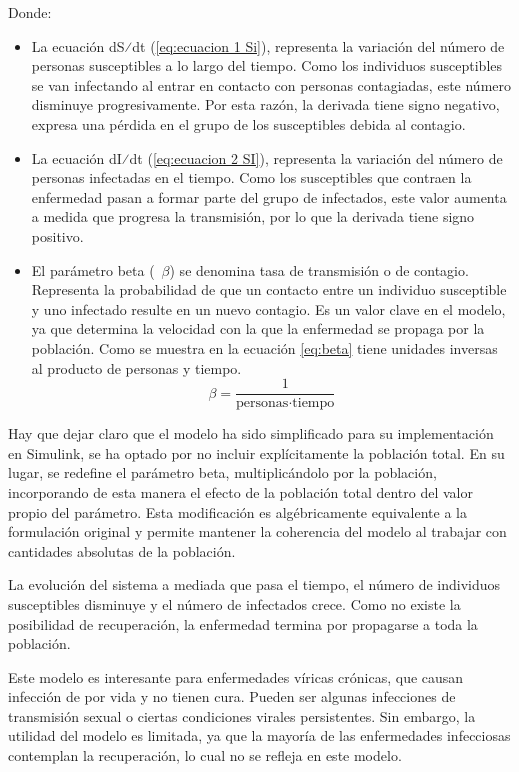 Donde:
\begin{itemize}
    \item 	La ecuación dS⁄dt (\ref{eq:ecuacion 1 Si}), representa la variación del número de personas susceptibles a lo largo del tiempo. Como los individuos susceptibles se van infectando al entrar en contacto con personas contagiadas, este número disminuye progresivamente. Por esta razón, la derivada tiene signo negativo, expresa una pérdida en el grupo de los susceptibles debida al contagio.
    \item 	La ecuación dI⁄dt (\ref{eq:ecuacion 2 SI}), representa la variación del número de personas infectadas en el tiempo. Como los susceptibles que contraen la enfermedad pasan a formar parte del grupo de infectados, este valor aumenta a medida que progresa la transmisión, por lo que la derivada tiene signo positivo.
    \item El parámetro beta (~$\beta$) se denomina tasa de transmisión o de contagio. Representa la probabilidad de que un contacto entre un individuo susceptible y uno infectado resulte en un nuevo contagio. Es un valor clave en el modelo, ya que determina la velocidad con la que la enfermedad se propaga por la población. Como se muestra en la ecuación \ref{eq:beta} tiene unidades inversas al producto de personas y tiempo.
    \begin{equation}
    \beta = \frac{1}{\text{personas} \cdot \text{tiempo}}
    \label{eq:beta}
    \end{equation}
\end{itemize}

Hay que dejar claro que el modelo ha sido simplificado para su implementación en Simulink, se ha optado por no incluir explícitamente la población total. En su lugar, se redefine el parámetro beta, multiplicándolo por la población, incorporando de esta manera el efecto de la población total dentro del valor propio del parámetro. Esta modificación es algébricamente equivalente a la formulación original y permite mantener la coherencia del modelo al trabajar con cantidades absolutas de la población. 

La evolución del sistema a mediada que pasa el tiempo, el número de individuos susceptibles disminuye y el número de infectados crece. Como no existe la posibilidad de recuperación, la enfermedad termina por propagarse a toda la población.

Este modelo es interesante para enfermedades víricas crónicas, que causan infección de por vida y no tienen cura. Pueden ser algunas infecciones de transmisión sexual o ciertas condiciones virales persistentes. Sin embargo, la utilidad del modelo es limitada, ya que la mayoría de las enfermedades infecciosas contemplan la recuperación, lo cual no se refleja en este modelo.

